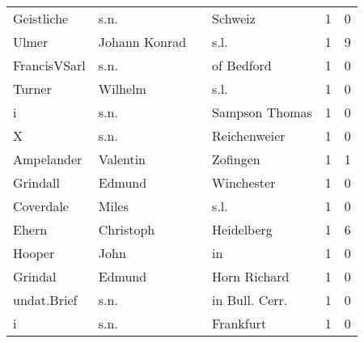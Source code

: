 \begin{center}
\begin{tiny}
\begin{longtabu}{llllrr}
               Geistliche &                               s.n. &             &                                     Schweiz &          1 &         0 \\
                    Ulmer &                      Johann Konrad &             &                                        s.l. &          1 &         9 \\
             FrancisVSarl &                               s.n. &             &                                  of Bedford &          1 &         0 \\
                   Turner &                            Wilhelm &             &                                        s.l. &          1 &         0 \\
                        i &                               s.n. &             &                              Sampson Thomas &          1 &         0 \\
                        X &                               s.n. &             &                                Reichenweier &          1 &         0 \\
               Ampelander &                           Valentin &             &                                    Zofingen &          1 &         1 \\
                 Grindall &                             Edmund &             &                                  Winchester &          1 &         0 \\
                Coverdale &                              Miles &             &                                        s.l. &          1 &         0 \\
                    Ehern &                          Christoph &             &                                  Heidelberg &          1 &         6 \\
                   Hooper &                               John &             &                                          in &          1 &         0 \\
                  Grindal &                             Edmund &             &                                Horn Richard &          1 &         0 \\
              undat.Brief &                               s.n. &             &                             in Bull. Cerr.  &          1 &         0 \\
                        i &                               s.n. &             &                                   Frankfurt &          1 &         0 \\

\end{longtabu}
\end{tiny}
\end{center}
